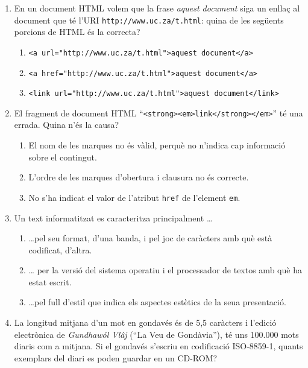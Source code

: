 \begin{enumerate}
\begin{enumerate}
\end{enumerate}

\item 
   En un document HTML volem que la frase \emph{aquest document}
   siga un enllaç al document que té l'URI
   \verb|http://www.uc.za/t.html|: quina de les següents
   porcions de HTML és la correcta?
   
\begin{enumerate}
\item 
    \verb|<a url="http://www.uc.za/t.html">aquest document</a>|
   
\item 
     \verb|<a href="http://www.uc.za/t.html">aquest document</a>|
      
\item 
     \verb|<link url="http://www.uc.za/t.html">aquest document</link>|
     
\end{enumerate}

\item El fragment de document HTML
``\verb|<strong><em>link</strong></em>|'' 
té una errada. Quina n'és la causa?
\begin{enumerate}
\item El nom de les marques no és vàlid, perquè no n'indica cap informació
sobre el contingut.
\item L'ordre de les marques d'obertura i clausura no és correcte.
\item No s'ha indicat el valor de l'atribut \verb|href| de
l'element \verb|em|.
\end{enumerate}


\item 
Un text informatitzat es caracteritza principalment {\ldots} 

\begin{enumerate}
\item  {\ldots}pel seu format, d'una banda, i pel joc de caràcters
amb què està codificat, d'altra.
\item  {\ldots} per la versió del sistema operatiu i el processador de
textos amb què ha estat escrit.
\item  {\ldots}pel full d'estil que indica els aspectes estètics de la
seua presentació.
\end{enumerate}

\item La longitud mitjana d'un mot en gondavés és de 5,5 caràcters i
   l'edició electrònica de \emph{Gundhawól Vlâj} (``La Veu de
   Gondàvia''), té uns 100.000 mots diaris com a
   mitjana. Si el gondavés s'escriu en codificació ISO-8859-1, quants
   exemplars del diari es poden guardar en un CD-ROM?
   

\end{enumerate}

